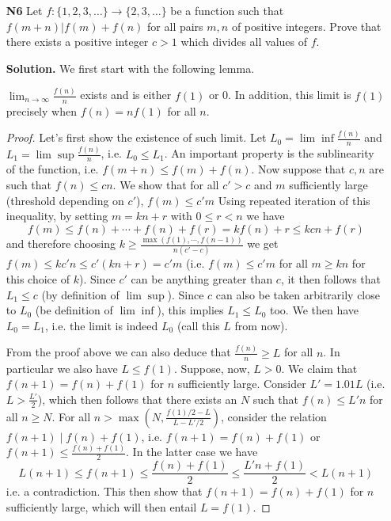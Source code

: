 \documentclass[11pt,a4paper]{article}
\begin{document}
\begin{enumerate}
	\item[\textbf{N6}] 
	Let $f : \{ 1, 2, 3, \dots \} \to \{ 2, 3, \dots \}$ be a function such that $f(m + n) | f(m) + f(n) $ for all pairs $m,n$ of positive integers. Prove that there exists a positive integer $c > 1$ which divides all values of $f$.
	
	\textbf{Solution.} 
	We first start with the following lemma. 
	\begin{lemma}\label{lmm:n6limits}
		  $\lim_{n\to\infty} \frac{f(n)}{n}$ exists and is either $f(1)$ or 0. 
		  In addition, this limit is $f(1)$ precisely when $f(n)=nf(1)$ for all $n$. 
	\end{lemma}
    
    \begin{proof}
    	Let's first show the existence of such limit. 
    	Let $L_0 = \lim\inf \frac{f(n)}{n}$ and $L_1=\lim\sup\frac{f(n)}{n}$, 
    	i.e. $L_0\le L_1$. 
    	An important property is the sublinearity of the function, i.e. $f(m+n)\le f(m)+f(n)$. 
    	Now suppose that $c, n$ are such that $f(n)\le cn$. 
    	We show that for all $c' > c$ and $m$ sufficiently large (threshold depending on $c'$), 
    	$f(m)\le c'm$
    	Using repeated iteration of this inequality, by setting $m=kn+r$ with $0\le r < n$ we have 
    	\begin{equation}
    		f(m)\le f(n)+\cdots + f(n) + f(r) = kf(n)+r\le kcn + f(r)
    	\end{equation}
    	and therefore choosing $k\ge \frac{\max(f(1), \cdots, f(n-1))}{n(c'-c)}$ we get $f(m)\le kc'n \le c'(kn+r)=c'm$ 
    	(i.e. $f(m)\le c'm$ for all $m\ge kn$ for this choice of $k$). 
    	Since $c'$ can be anything greater than $c$, it then follows that $L_1\le c$ (by definition of $\lim\sup$). 
    	Since $c$ can also be taken arbitrarily close to $L_0$ (be definition of $\lim\inf$), 
    	this implies $L_1\le L_0$ too. 
    	We then have $L_0=L_1$, i.e. the limit is indeed $L_0$ (call this $L$ from now). 
    	
    	From the proof above we can also deduce that $\frac{f(n)}{n}\ge L$ for all $n$. 
    	In particular we also have $L\le f(1)$. 
    	Suppose, now, $L > 0$. 
    	We claim that $f(n + 1) = f(n) + f(1)$ for $n$ sufficiently large. 
    	Consider $L'=1.01L$ (i.e. $L>\frac{L'}{2}$), which then follows that there exists an $N$ such that $f(n)\le L'n$ for all $n\ge N$. 
    	For all $n > \max(N, \frac{f(1)/2 - L}{L-L'/2})$, 
    	consider the relation $f(n + 1)\mid f(n)+f(1)$, 
    	i.e. $f(n + 1) = f(n) + f(1)$ or $f(n + 1)\le \frac{f(n)+f(1)}{2}$. 
    	In the latter case we have 
    	\begin{equation}
    		  L(n + 1)\le f(n + 1)\le \frac{f(n)+f(1)}{2} \le \frac{L'n + f(1)}{2} < L(n + 1)
    	\end{equation}
        i.e. a contradiction. This then show that $f(n + 1) = f(n) + f(1)$ for $n$ sufficiently large, 
        which will then entail $L = f(1)$. 
        

\end{proof}
\end{enumerate}
\end{document}
